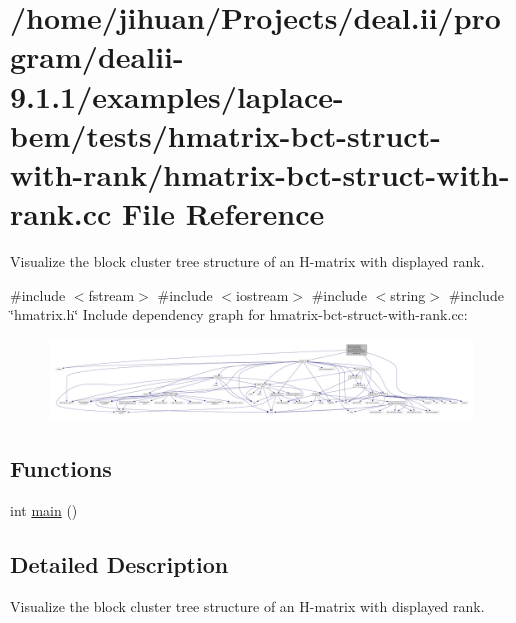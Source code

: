 \hypertarget{hmatrix-bct-struct-with-rank_8cc}{}\section{/home/jihuan/\+Projects/deal.ii/program/dealii-\/9.1.1/examples/laplace-\/bem/tests/hmatrix-\/bct-\/struct-\/with-\/rank/hmatrix-\/bct-\/struct-\/with-\/rank.cc File Reference}
\label{hmatrix-bct-struct-with-rank_8cc}


Visualize the block cluster tree structure of an H-\/matrix with displayed rank.  


{\ttfamily \#include $<$fstream$>$}\newline
{\ttfamily \#include $<$iostream$>$}\newline
{\ttfamily \#include $<$string$>$}\newline
{\ttfamily \#include \char`\"{}hmatrix.\+h\char`\"{}}\newline
Include dependency graph for hmatrix-\/bct-\/struct-\/with-\/rank.cc\+:\nopagebreak
\begin{figure}[H]
\begin{center}
\leavevmode
\includegraphics[width=350pt]{hmatrix-bct-struct-with-rank_8cc__incl}
\end{center}
\end{figure}
\subsection*{Functions}
\begin{DoxyCompactItemize}
\item 
int \hyperlink{hmatrix-bct-struct-with-rank_8cc_ae66f6b31b5ad750f1fe042a706a4e3d4}{main} ()
\end{DoxyCompactItemize}


\subsection{Detailed Description}
Visualize the block cluster tree structure of an H-\/matrix with displayed rank. 

